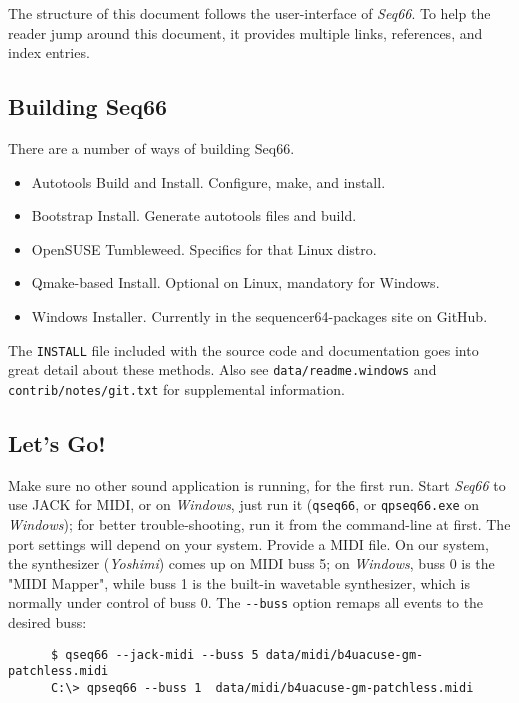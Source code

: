 \documentclass[
 11pt,
 twoside,
 a4paper,
 final                                 %
]{article}
\begin{document}
   The structure of this document follows the user-interface of
   \textsl{Seq66}.
   To help the reader jump around this document, it provides
   multiple links, references, and index entries.

\subsection{Building Seq66}
\label{subsec:introduction_building_seq66}

   There are a number of ways of building Seq66.

   \begin{itemize}
      \item Autotools Build and Install. Configure, make, and install.
      \item Bootstrap Install. Generate autotools files and build.
      \item OpenSUSE Tumbleweed. Specifics for that Linux distro.
      \item Qmake-based Install. Optional on Linux, mandatory for Windows.
      \item Windows Installer.  Currently in the sequencer64-packages site on
         GitHub.
   \end{itemize}

   The \texttt{INSTALL} file included with the source code and
   documentation goes into great detail about these methods.
   Also see \texttt{data/readme.windows} and \texttt{contrib/notes/git.txt}
   for supplemental information.

\subsection{Let's Go!}
\label{subsec:introduction_lets_go}

   Make sure no other sound application is running, for the first run.
   Start \textsl{Seq66} to use JACK for MIDI, or
   on \textsl{Windows}, just run it (\texttt{qseq66}, or \texttt{qpseq66.exe}
   on \textsl{Windows}); for better trouble-shooting, run it from
   the command-line at first.
   The port settings will depend on your system.
   Provide a MIDI file.
   On our system, the synthesizer (\textsl{Yoshimi}) comes up on MIDI buss 5;
   on \textsl{Windows}, buss 0 is the "MIDI Mapper", while buss 1 is the
   built-in wavetable synthesizer, which is normally under control of buss 0.
   The \texttt{-{}-buss} option remaps all events to the desired buss:

   \begin{verbatim}
      $ qseq66 --jack-midi --buss 5 data/midi/b4uacuse-gm-patchless.midi
      C:\> qpseq66 --buss 1  data/midi/b4uacuse-gm-patchless.midi
   \end{verbatim}
\end{document}
